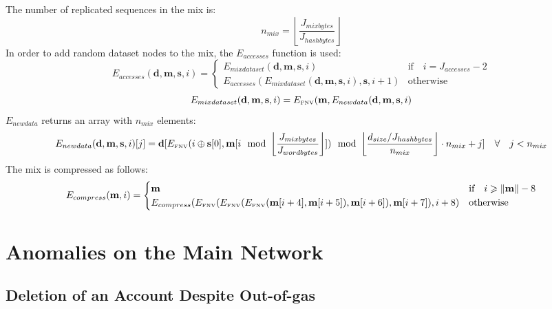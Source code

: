 \documentclass[9pt,oneside]{amsart}
\begin{document}
The number of replicated sequences in the mix is:
\begin{equation}
 n_{mix} =  \left\lfloor\frac{J_{mixbytes}}{J_{hashbytes}}\right\rfloor
\end{equation}
In order to add random dataset nodes to the mix, the $E_{accesses}$ function is used:
\begin{equation}
 E_{accesses}(\mathbf{d}, \mathbf{m}, \mathbf{s}, i) = \begin{cases}
E_{mixdataset}(\mathbf{d}, \mathbf{m},  \mathbf{s}, i) & \text{if} \quad i = J_{accesses} -2 \\
E_{accesses}(E_{mixdataset}(\mathbf{d}, \mathbf{m}, \mathbf{s}, i), \mathbf{s}, i + 1) & \text{otherwise}
\end{cases}
\end{equation}
\begin{equation}
 E_{mixdataset}(\mathbf{d}, \mathbf{m}, \mathbf{s}, i) = E_\text{\tiny FNV}(\mathbf{m}, E_{newdata}(\mathbf{d}, \mathbf{m}, \mathbf{s}, i)
\end{equation}
$E_{newdata}$ returns an array with $n_{mix}$ elements:
\begin{equation}
 E_{newdata}(\mathbf{d}, \mathbf{m}, \mathbf{s}, i)[j] = \mathbf{d}[E_\text{\tiny FNV}(i \oplus \mathbf{s}[0], \mathbf{m}[i \mod \left\lfloor\frac{J_{mixbytes}}{J_{wordbytes}}\right\rfloor]) \mod \left\lfloor\frac{d_{size} / J_{hashbytes}}{n_{mix}}\right\rfloor \cdot n_{mix} + j] \quad \forall \quad j < n_{mix}
\end{equation}
The mix is compressed as follows:
\begin{equation}
 E_{compress}(\mathbf{m}, i) = \begin{cases}
\mathbf{m} & \text{if} \quad i \geqslant \lVert \mathbf{m} \rVert - 8 \\
E_{compress}(E_\text{\tiny FNV}(E_\text{\tiny FNV}(E_\text{\tiny FNV}(\mathbf{m}[i + 4], \mathbf{m}[i + 5]), \mathbf{m}[i + 6]), \mathbf{m}[i + 7]), i + 8) & \text{otherwise}
\end{cases}
\end{equation}

\section{Anomalies on the Main Network}

\subsection{Deletion of an Account Despite Out-of-gas}
\end{document}
